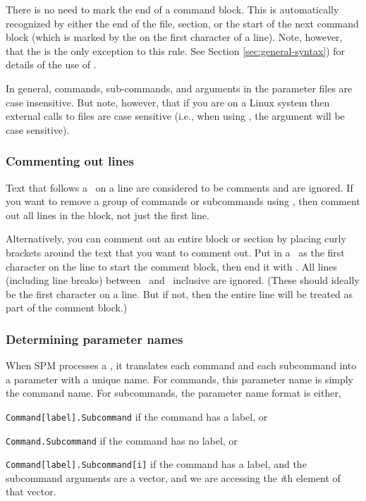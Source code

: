There is no need to mark the end of a command block. This is automatically recognized by either the end of the file, section, or the start of the next command block (which is marked by the \command{} on the first character of a line). Note, however, that the  is the only exception to this rule. See Section \ref{sec:general-syntax}) for details of the use of . 

In general, commands, sub-commands, and arguments in the parameter files are case insensitive. But note, however, that if you are on a Linux system then external calls to files are case sensitive (i.e., when using  , the argument  will be case sensitive). 

\subsubsection{Commenting out lines}

Text that follows a \commentline\ on a line are considered to be comments and are ignored. If you want to remove a group of commands or subcommands using \commentline, then comment out all lines in the block, not just the first line. 

Alternatively, you can comment out an entire block or section by placing curly brackets around the text that you want to comment out. Put in a \commentstart\ as the first character on the line to start the comment block, then end it with \commentend. All lines (including line breaks) between \commentstart\ and \commentend\ inclusive are ignored. (These should ideally be the first character on a line. But if not, then the entire line will be treated as part of the comment block.)

\subsubsection{Determining parameter names}

When SPM processes a \config, it translates each command and each subcommand into a parameter with a unique name. For commands, this parameter name is simply the command name. For subcommands, the parameter name format is either, 

\begin{description}
\item \texttt{Command[label].Subcommand} if the command has a label, or
\item \texttt{Command.Subcommand} if the command has no label, or
\item \texttt{Command[label].Subcommand[i]} if the command has a label, and the subcommand arguments are a vector, and we are accessing the  \emph{i}th element of that vector. 
\end{description} 

